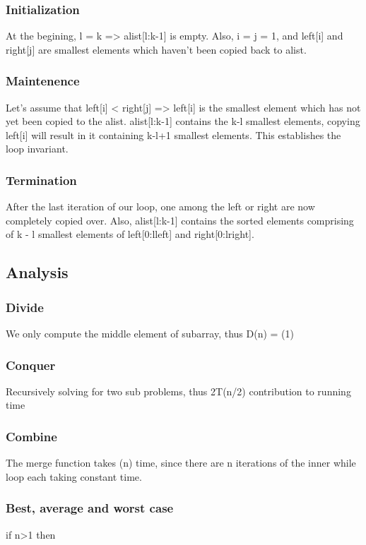 \documentclass{article}
\begin{document}
\subsubsection{Initialization}
At the begining, l = k => alist[l:k-1] is empty. Also, i = j = 1, and left[i] and right[j] are smallest elements which haven't been copied back to alist.

\subsubsection{Maintenence}
Let's assume that left[i] < right[j] => left[i] is the smallest element which has not yet been copied to the alist. alist[l:k-1] contains the k-l smallest elements, copying left[i] will result in it containing k-l+1 smallest elements. This establishes the loop invariant.

\subsubsection{Termination}
After the last iteration of our loop, one among the left or right are now completely copied over. Also, alist[l:k-1] contains the sorted elements comprising of k - l smallest elements of left[0:lleft] and right[0:lright].

\subsection{Analysis}
\subsubsection{Divide}
We only compute the middle element of subarray, thus D(n) = \theta(1)
\subsubsection{Conquer}
Recursively solving for two sub problems, thus 2T(n/2) contribution to running time
\subsubsection{Combine}
The merge function takes \theta(n) time, since there are n iterations of the inner while loop each taking constant time.

\subsubsection{Best, average and worst case}
if n>1 then
\end{document}
